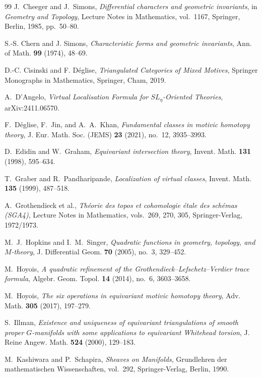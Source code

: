 \documentclass[10pt,a4paper,dvipsnames,x11names]{amsart}
\numberwithin{equation}{section}
\theoremstyle{plain}
\theoremstyle{definition}
\theoremstyle{remark}
\begin{document}
\begin{thebibliography}{99}
J.~Cheeger and J.~Simons,
\emph{Differential characters and geometric invariants},
in \emph{Geometry and Topology}, Lecture Notes in Mathematics, vol.~1167,
Springer, Berlin, 1985, pp.~50--80.

S.-S. Chern and J. Simons,
\emph{Characteristic forms and geometric invariants},
Ann. of Math. \textbf{99} (1974), 48--69.


D.-C. Cisinski and F. D\'eglise,
\emph{Triangulated Categories of Mixed Motives},
Springer Monographs in Mathematics, Springer, Cham, 2019.

A.~D'Angelo,
\emph{Virtual Localisation Formula for $SL_{\eta}$-Oriented Theories},
arXiv:2411.06570.


F.~D\'eglise, F.~Jin, and A.~A.~Khan,
\emph{Fundamental classes in motivic homotopy theory},
J. Eur. Math. Soc. (JEMS) \textbf{23} (2021), no.~12, 3935--3993.

D.~Edidin and W.~Graham,
\emph{Equivariant intersection theory},
Invent. Math. \textbf{131} (1998), 595--634.

T.~Graber and R.~Pandharipande,
\emph{Localization of virtual classes},
Invent. Math. \textbf{135} (1999), 487--518.

A.~Grothendieck et al.,
\emph{Th\'eorie des topos et cohomologie \'{e}tale des sch\'emas (SGA4)},
Lecture Notes in Mathematics, vols.~269, 270, 305, Springer-Verlag, 1972/1973.

M.~J.~Hopkins and I.~M.~Singer,
\emph{Quadratic functions in geometry, topology, and $M$-theory},
J. Differential Geom. \textbf{70} (2005), no.~3, 329--452.

M.~Hoyois,
\emph{A quadratic refinement of the Grothendieck--Lefschetz--Verdier trace formula},
Algebr. Geom. Topol. \textbf{14} (2014), no.~6, 3603--3658.

M.~Hoyois,
\emph{The six operations in equivariant motivic homotopy theory},
Adv. Math. \textbf{305} (2017), 197--279.

S.~Illman,
\emph{Existence and uniqueness of equivariant triangulations of smooth proper $G$-manifolds with some applications to equivariant Whitehead torsion},
J. Reine Angew. Math. \textbf{524} (2000), 129--183.

M.~Kashiwara and P.~Schapira,
\emph{Sheaves on Manifolds},
Grundlehren der mathematischen Wissenschaften, vol.~292, Springer-Verlag, Berlin, 1990.


\end{thebibliography}
\end{document}
